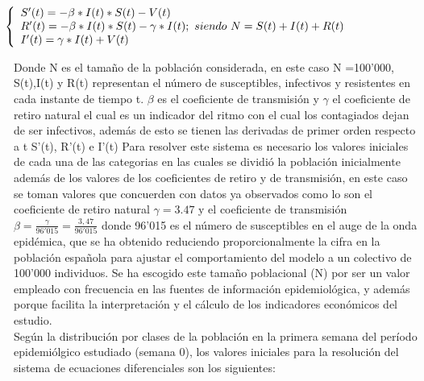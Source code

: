 \documentclass{wscpaperproc}
\theoremstyle{wsc}
\begin{document}
\begin{equation}
\hspace{-7em}
\begin{aligned}
\left\{
\begin{array}{l}
S'(t) = -\beta*I(t)*S(t)-V(t) \\
R'(t) = -\beta*I(t)*S(t)- \gamma*I(t); \ siendo \ N = S(t)+I(t)+R(t)\\
I'(t) = \gamma*I(t)+ V(t)
\end{array}
\right.
\end{aligned}
\end{equation}

Donde N es el tamaño de la población considerada, en este caso N =100'000,
S(t),I(t) y R(t) representan el número de susceptibles, infectivos y resistentes en cada instante de tiempo t.
$\beta$ es el coeficiente de transmisión  y $\gamma$ el coeficiente de retiro natural el cual 
es un indicador del ritmo con el cual los contagiados dejan de ser infectivos, además de esto
se tienen las derivadas de primer orden respecto a t S'(t), R'(t) e I'(t)
Para resolver este sistema es necesario los valores iniciales de cada una de 
las categorias en las cuales se dividió la población inicialmente además de los valores de los coeficientes
de retiro y de transmisión, en este caso se toman valores que concuerden con datos ya observados
como lo son el coeficiente de retiro natural $\gamma = 3.47$ y el coeficiente de transmisión
$\beta = \frac{\gamma}{96'015} = \frac{3,47}{96'015}$ donde 96'015 es el número
de susceptibles en el auge de la onda epidémica, que se ha obtenido reduciendo proporcionalmente
la cifra en la población española para ajustar el comportamiento
del modelo a un colectivo de 100'000 individuos. Se ha escogido
este tamaño poblacional (N) por ser un valor empleado con
frecuencia en las fuentes de información epidemiológica, y
además porque facilita la interpretación y el cálculo de los
indicadores económicos del estudio.\\
Según la distribución por clases de la población en la primera
semana del período epidemiólgico estudiado (semana 0), los
valores iniciales para la resolución del sistema de ecuaciones
diferenciales son los siguientes:
\end{document}
